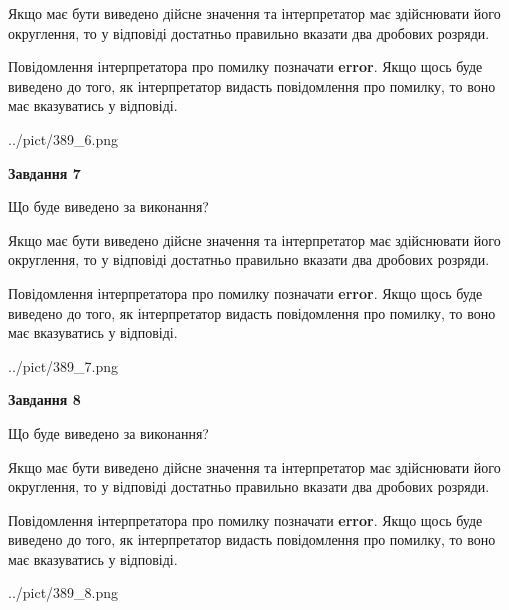 \documentclass[12pt, ukrainian]{article}
\begin{document}
{\begin {Large}
Якщо має бути виведено дійсне значення та інтерпретатор має здійснювати його округлення, 
то у відповіді достатньо правильно вказати два дробових розряди.

Повідомлення інтерпретатора про помилку позначати \textbf{error}.
Якщо щось буде виведено до того, як інтерпретатор видасть повідомлення про помилку, 
то воно має вказуватись у відповіді. \par

\begin{center}
	{../pict/389_6.png}
\end{center}
\newpage

{\begin {center}\textbf{Завдання 7}\end {center}}\par
Що буде виведено за виконання? \par

Якщо має бути виведено дійсне значення та інтерпретатор має здійснювати його округлення, 
то у відповіді достатньо правильно вказати два дробових розряди.

Повідомлення інтерпретатора про помилку позначати \textbf{error}.
Якщо щось буде виведено до того, як інтерпретатор видасть повідомлення про помилку, 
то воно має вказуватись у відповіді. \par

\begin{center}
	{../pict/389_7.png}
\end{center}
\newpage

{\begin {center}\textbf{Завдання 8}\end {center}}\par
Що буде виведено за виконання? \par

Якщо має бути виведено дійсне значення та інтерпретатор має здійснювати його округлення, 
то у відповіді достатньо правильно вказати два дробових розряди.

Повідомлення інтерпретатора про помилку позначати \textbf{error}.
Якщо щось буде виведено до того, як інтерпретатор видасть повідомлення про помилку, 
то воно має вказуватись у відповіді. \par

\begin{center}
	{../pict/389_8.png}
\end{center}
\newpage


\end{Large}}
\end{document}
